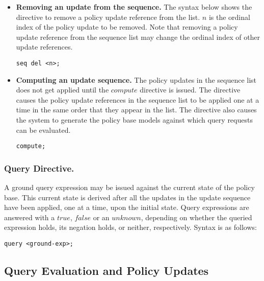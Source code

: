 \documentclass[11pt]{llncs}
\begin{document}
\begin{itemize}
          \vspace{1mm}
          \item
            {\bf Removing an update from the sequence.} The syntax below
            shows the directive to remove a policy update reference from the
            list. $n$ is the ordinal index of the policy update to be
            removed. Note that removing a policy update reference from the
            sequence list may change the ordinal index of other update
            references.
                                                                
            \begin{verbatim}seq del <n>;\end{verbatim}

          \vspace{1mm}
          \item
            {\bf Computing an update sequence.} The policy updates in the
            sequence list does not get applied until the $compute$ directive
            is issued. The directive causes the policy update references in
            the sequence list to be applied one at a time in the same order
            that they appear in the list. The directive also causes the
            system to generate the policy base models against which query
            requests can be evaluated.

           \begin{verbatim}compute;\end{verbatim}
        \end{itemize}

      \subsubsection{Query Directive.}

        A ground query expression may be issued against the current state of
        the policy base. This current state is derived after all the updates
        in the update sequence have been applied, one at a time, upon the
        initial state. Query expressions are answered with a $true$, $false$
        or an $unknown$, depending on whether the queried expression holds,
        its negation holds, or neither, respectively. Syntax is as follows:

        \begin{verbatim}query <ground-exp>;\end{verbatim}

    \subsection{Query Evaluation and Policy Updates}
\end{document}
